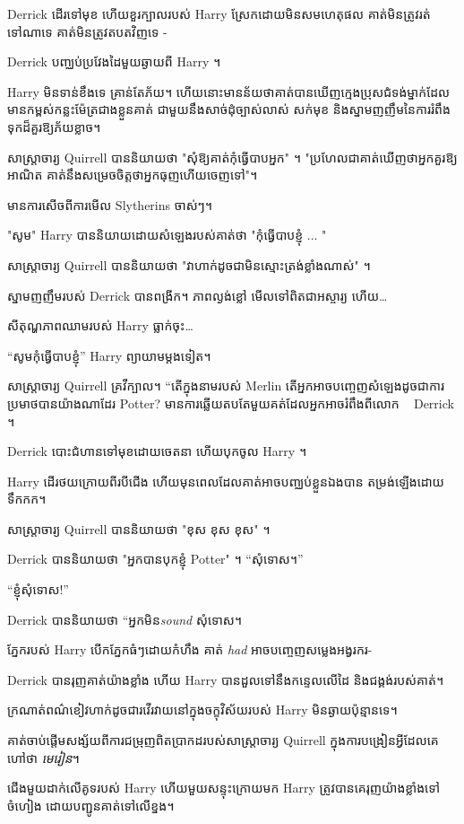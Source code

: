 {{{{{Derrick ដើរទៅមុខ ហើយខួរក្បាលរបស់ Harry ស្រែកដោយមិនសមហេតុផល គាត់មិនត្រូវរត់ទៅណាទេ គាត់មិនត្រូវតបតវិញទេ -

Derrick បញ្ឈប់ប្រវែងដៃមួយឆ្ងាយពី Harry ។

Harry មិនទាន់ខឹងទេ គ្រាន់តែភ័យ។ ហើយនោះមានន័យថាគាត់បានឃើញក្មេងប្រុសជំទង់ម្នាក់ដែលមានកម្ពស់កន្លះម៉ែត្រជាងខ្លួនគាត់ ជាមួយនឹងសាច់ដុំច្បាស់លាស់ សក់មុខ និងស្នាមញញឹមនៃការរំពឹងទុកដ៏គួរឱ្យភ័យខ្លាច។

សាស្រ្តាចារ្យ Quirrell បាននិយាយថា "សុំឱ្យគាត់កុំធ្វើបាបអ្នក" ។ "ប្រហែល​ជា​គាត់​ឃើញ​ថា​អ្នក​គួរ​ឱ្យ​អាណិត គាត់​នឹង​សម្រេច​ចិត្ត​ថា​អ្នក​ធុញ​ហើយ​ចេញ​ទៅ"។

មានការសើចពីការមើល Slytherins ចាស់ៗ។

"សូម" Harry បាននិយាយដោយសំឡេងរបស់គាត់ថា "កុំធ្វើបាបខ្ញុំ ... "

សាស្រ្តាចារ្យ Quirrell បាននិយាយថា "វាហាក់ដូចជាមិនស្មោះត្រង់ខ្លាំងណាស់" ។

ស្នាមញញឹមរបស់ Derrick បានពង្រីក។ ភាពល្ងង់ខ្លៅ មើលទៅពិតជាអស្ចារ្យ ហើយ…

សីតុណ្ហភាព​ឈាម​របស់ Harry ធ្លាក់​ចុះ…

“សូម​កុំ​ធ្វើ​បាប​ខ្ញុំ” Harry ព្យាយាម​ម្ដង​ទៀត។

សាស្ត្រាចារ្យ Quirrell គ្រវីក្បាល។ “តើ​ក្នុង​នាម​របស់ Merlin តើ​អ្នក​អាច​បញ្ចេញ​សំឡេង​ដូច​ជា​ការ​ប្រមាថ​បាន​យ៉ាង​ណា​ដែរ Potter? មានការឆ្លើយតបតែមួយគត់ដែលអ្នកអាចរំពឹងពីលោក ~ Derrick ។

Derrick បោះជំហានទៅមុខដោយចេតនា ហើយបុកចូល Harry ។

Harry ដើរថយក្រោយពីរបីជើង ហើយមុនពេលដែលគាត់អាចបញ្ឈប់ខ្លួនឯងបាន តម្រង់ឡើងដោយទឹកកក។

សាស្រ្តាចារ្យ Quirrell បាននិយាយថា "ខុស ខុស ខុស" ។

Derrick បាននិយាយថា "អ្នកបានបុកខ្ញុំ Potter" ។ “សុំទោស។”

“ខ្ញុំសុំទោស!”

Derrick បាននិយាយថា “អ្នកមិន\emph{sound} សុំទោស។

ភ្នែករបស់ Harry បើកភ្នែកធំៗដោយកំហឹង គាត់ \emph{had} អាចបញ្ចេញសម្លេងអង្វរករ-

Derrick បាន​រុញ​គាត់​យ៉ាង​ខ្លាំង ហើយ Harry បាន​ដួល​ទៅ​នឹង​កន្ទេល​លើ​ដៃ និង​ជង្គង់​របស់គាត់។

ក្រណាត់ពណ៌ខៀវហាក់ដូចជារវើរវាយនៅក្នុងចក្ខុវិស័យរបស់ Harry មិនឆ្ងាយប៉ុន្មានទេ។

គាត់ចាប់ផ្តើមសង្ស័យពីការជម្រុញពិតប្រាកដរបស់សាស្រ្តាចារ្យ Quirrell ក្នុងការបង្រៀនអ្វីដែលគេហៅថា \emph{មេរៀន}។

ជើង​មួយ​ដាក់​លើ​គូទ​របស់ Harry ហើយ​មួយ​សន្ទុះ​ក្រោយ​មក Harry ត្រូវ​បាន​គេ​រុញ​យ៉ាង​ខ្លាំង​ទៅ​ចំហៀង ដោយ​បញ្ជូន​គាត់​ទៅ​លើ​ខ្នង។

}}}}}
